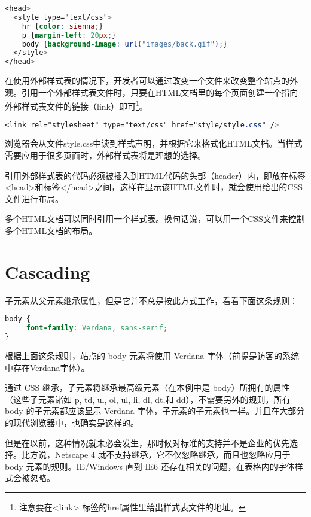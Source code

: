 \begin{lstlisting}[language=CSS]
<head>
  <style type="text/css">
    hr {color: sienna;}
    p {margin-left: 20px;}
    body {background-image: url("images/back.gif");}
  </style>
</head>
\end{lstlisting}



在使用外部样式表的情况下，开发者可以通过改变一个文件来改变整个站点的外观。引用一个外部样式表文件时，只要在HTML文档里的每个页面创建一个指向外部样式表文件的链接（link）即可\footnote{注意要在<link> 标签的href属性里给出样式表文件的地址。}。

\begin{lstlisting}[language=CSS]
<link rel="stylesheet" type="text/css" href="style/style.css" />
\end{lstlisting}

浏览器会从文件style.css中读到样式声明，并根据它来格式化HTML文档。当样式需要应用于很多页面时，外部样式表将是理想的选择。

引用外部样式表的代码必须被插入到HTML代码的头部（header）内，即放在标签<head>和标签</head>之间，这样在显示该HTML文件时，就会使用给出的CSS文件进行布局。

多个HTML文档可以同时引用一个样式表。换句话说，可以用一个CSS文件来控制多个HTML文档的布局。


\section{Cascading}


子元素从父元素继承属性，但是它并不总是按此方式工作，看看下面这条规则：

\begin{lstlisting}[language=CSS]
body {
     font-family: Verdana, sans-serif;
}
\end{lstlisting}

根据上面这条规则，站点的 body 元素将使用 Verdana 字体（前提是访客的系统中存在Verdana字体）。

通过 CSS 继承，子元素将继承最高级元素（在本例中是 body）所拥有的属性（这些子元素诸如 p, td, ul, ol, ul, li, dl, dt,和 dd），不需要另外的规则，所有 body 的子元素都应该显示 Verdana 字体，子元素的子元素也一样。并且在大部分的现代浏览器中，也确实是这样的。

但是在以前，这种情况就未必会发生，那时候对标准的支持并不是企业的优先选择。比方说，Netscape 4 就不支持继承，它不仅忽略继承，而且也忽略应用于 body 元素的规则。IE/Windows 直到 IE6 还存在相关的问题，在表格内的字体样式会被忽略。

